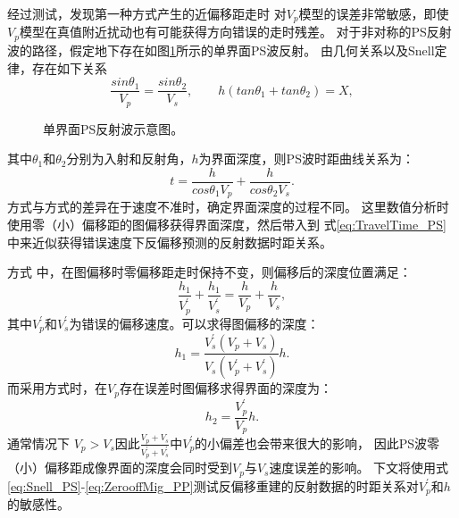 经过测试，发现第一种方式产生的近偏移距走时
对$V_p$模型的误差非常敏感，即使$V_p$模型在真值附近扰动也有可能获得方向错误的走时残差。
对于非对称的PS反射波的路径，假定地下存在如图\ref{fig:PS_refl}所示的单界面PS波反射。
由几何关系以及Snell定律，存在如下关系
\begin{equation}
    \frac{sin\theta_1}{V_p}=\frac{sin\theta_2}{V_s},\qquad
    h(tan\theta_1+tan\theta_2)=X,
    \label{eq:Snell_PS} 
\end{equation}
\begin{figure}
   \centering
   \caption{单界面PS反射波示意图。}
   \label{fig:PS_refl}
\end{figure}
其中$\theta_1$和$\theta_2$分别为入射和反射角，$h$为界面深度，则PS波时距曲线关系为：
\begin{equation}
	t=\frac{h}{cos\theta_1V_p}+\frac{h}{cos\theta_2V_s}.
    \label{eq:TravelTime_PS} 
\end{equation}
方式\uppercase\expandafter{}与方式\uppercase\expandafter{}的差异在于速度不准时，确定界面深度的过程不同。
这里数值分析时使用零（小）偏移距的图偏移获得界面深度，然后带入到
式\eqref{eq:TravelTime_PS}中来近似获得错误速度下反偏移预测的反射数据时距关系。

方式\uppercase\expandafter{}
中，在图偏移时零偏移距走时保持不变，则偏移后的深度位置满足：
\begin{equation}
	\frac{h_{1}}{V^{'}_p}+\frac{h_{1}}{V^{'}_s}=\frac{h}{V_p}+\frac{h}{V_s},
    \label{eq:Mapmigration_PS} 
\end{equation}
其中$V^{'}_p$和$V^{'}_s$为错误的偏移速度。可以求得图偏移的深度：
\begin{equation}
	{h_{1}}=\frac{V^{'}_s(V_p+V_s)}{V_s(V^{'}_p+V^{'}_s)}h.
    \label{eq:ZerooffMig_PS} 
\end{equation}
而采用方式\uppercase\expandafter{}时，在$V_p$存在误差时图偏移求得界面的深度为：
\begin{equation}
	{h_{2}}=\frac{V^{'}_p}{V_p}h.
    \label{eq:ZerooffMig_PP} 
\end{equation}
通常情况下
$V_p>V_s$因此$\frac{V_p+V_s}{V^{'}_p+V^{'}_s}$中$V^{'}_p$的小偏差也会带来很大的影响，
因此PS波零（小）偏移距成像界面的深度会同时受到$V_p$与$V_s$速度误差的影响。
下文将使用式\eqref{eq:Snell_PS}-\eqref{eq:ZerooffMig_PP}测试反偏移重建的反射数据的时距关系对$V^{'}_p$和$h$的敏感性。

